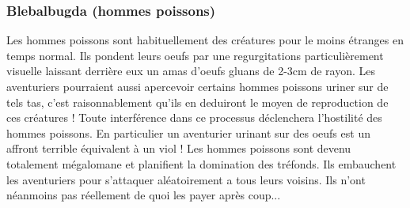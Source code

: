 \subsubsection*{Blebalbugda (hommes poissons)}

Les hommes poissons sont habituellement des créatures pour le moins étranges en temps normal.  Ils pondent leurs oeufs par une regurgitations particulièrement visuelle laissant derrière eux un amas d'oeufs gluans de 2-3cm de rayon. Les aventuriers pourraient aussi apercevoir certains hommes poissons uriner sur de tels tas, c'est raisonnablement qu'ils en deduiront le moyen de reproduction de ces créatures !  Toute interférence dans ce processus déclenchera l'hostilité des hommes poissons. En particulier un aventurier urinant sur des oeufs est un affront terrible équivalent à un viol ! Les hommes poissons sont devenu totalement mégalomane et planifient la domination des tréfonds. Ils embauchent les aventuriers pour s'attaquer aléatoirement a tous leurs voisins. Ils n'ont néanmoins pas réellement de quoi les payer après coup...
